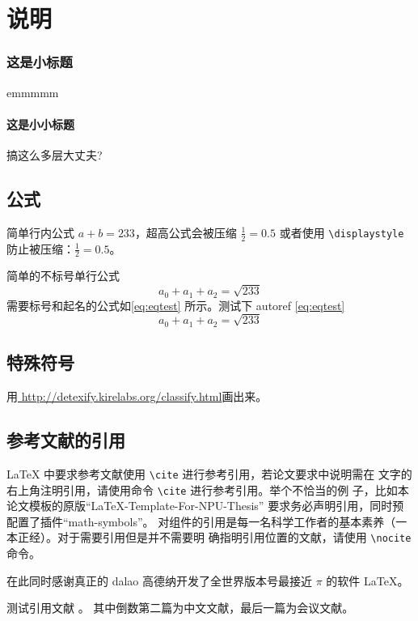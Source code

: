 \documentclass[lang=chs, degree=master, blindreview=false, adobe=false]{yanputhesis}
\begin{document}
\chapter{说明}
\subsection{这是小标题}
emmmmm
\subsubsection{这是小小标题}
搞这么多层大丈夫?

\section{公式}
简单行内公式 $a+b=233$，超高公式会被压缩 $\frac{1}{2}=0.5$ 或者使用
\lstinline`\displaystyle` 防止被压缩：$\displaystyle \frac{1}{2}=0.5$。

简单的不标号单行公式
$$a_0+a_1+a_2=\sqrt{233}$$
需要标号和起名的公式如\autoref{eq:eqtest} 所示。测试下 autoref \autoref{eq:eqtest}
\begin{equation}
    \label{eq:eqtest}
    a_0 + a_1 + a_2 = \sqrt{233}
\end{equation}

\section{特殊符号}

用\href{http://detexify.kirelabs.org/classify.html}{
    http://detexify.kirelabs.org/classify.html}画出来。

\section{参考文献的引用}

\LaTeX{} 中要求参考文献使用 \lstinline`\cite` 进行参考引用，若论文要求中说明需在
文字的右上角注明引用，请使用命令 \lstinline`\cite` 进行参考引用。举个不恰当的例
子，比如本论文模板的原版“LaTeX-Template-For-NPU-Thesis”\cite{NWPUThesisLaTeXTemplate}
要求务必声明引用，同时预配置了插件“math-symbols”\cite{MathSymbolsinLaTeXbypolossk}。
对组件的引用是每一名科学工作者的基本素养（一本正经）。对于需要引用但是并不需要明
确指明引用位置的文献，请使用 \lstinline`\nocite` 命令。

在此同时感谢真正的 dalao 高德纳开发了全世界版本号最接近 $\pi$ 的软件
\LaTeX \cite{knuth1986the}\nocite{lamport1989latex}。

测试引用文献 \cite{szegedy2015going, shen2021peridynamic, chen2014maiyuan, chen2018autonomous}。
其中倒数第二篇为中文文献，最后一篇为会议文献。
\end{document}
